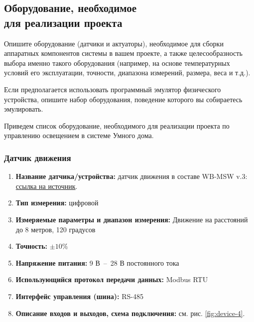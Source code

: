 \documentclass[a4paper,14pt]{extarticle}
\begin{document}
\subsection{Оборудование, необходимое \\для реализации проекта}
\begin{problem}
	Опишите оборудование (датчики и актуаторы), необходимое для сборки
	аппаратных компонентов системы в вашем проекте, а также целесообразность выбора
	именно такого оборудования (например, на основе температурных условий его
	эксплуатации, точности, диапазона измерений, размера, веса и т.д.).
	
	Если предполагается использовать программный эмулятор физического устройства,
	опишите набор оборудования, поведение которого вы собираетесь эмулировать.
	
	

	\nonum  
	Приведем список оборудование, необходимого для реализации проекта по управлению освещением в системе Умного дома.
	
	\subsubsection*{Датчик движения}
	
	
	\begin{enumerate}
		\item \textbf{Название датчика/устройства:} датчик движения в составе WB-MSW v.3: \href{https://wirenboard.com/ru/product/wb-msw-v3}{ссылка на источник}.
		
		\item \textbf{Тип измерения:} цифровой
		
		\item  \textbf{Измеряемые параметры и диапазон измерения:}  Движение на расстояний до 8 метров, 120 градусов
		
		\item  \textbf{Точность:} $\pm10 \%$	
		\item  \textbf{Напряжение питания:} 9 В~--~28 В постоянного тока
		
		\item  \textbf{Использующийся протокол передачи данных:} Modbus RTU
		
		\item  \textbf{Интерфейс управления (шина):} RS-485
		
		\item  \textbf{Описание входов и выходов, схема подключения:} см. рис. \ref{fig:device-4}.
	\end{enumerate}
	

\end{problem}
\end{document}
